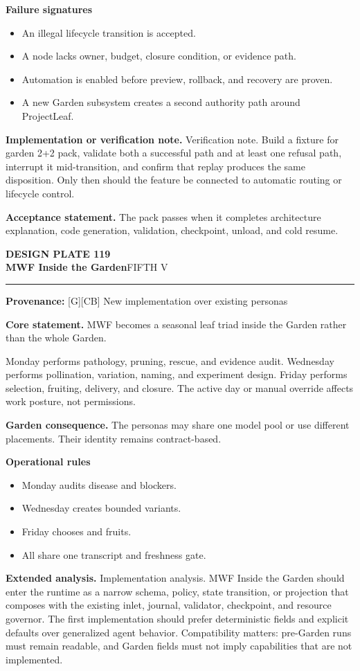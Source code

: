 \documentclass[10pt,letterpaper,oneside]{article}
\newcommand{\prov}[1]{\textcolor{gardenBlue}{\sffamily\footnotesize\textbf{Provenance:} #1}}
\newcommand{\platetitle}[3]{%
  \begin{minipage}[t][0.54in][t]{\textwidth}
  {\sffamily\bfseries\color{gardenDeep}\fontsize{9}{10}\selectfont DESIGN PLATE #1}\\[-1pt]
  {\sffamily\bfseries\color{gardenInk}\fontsize{16.5}{18}\selectfont #2}\hfill{\sffamily\color{gardenGreen}\large #3}
  \end{minipage}\vspace{-2pt}\hrule\vspace{5pt}}
\begin{document}
\textbf{Failure signatures}
\begin{itemize}
\item An illegal lifecycle transition is accepted.
\item A node lacks owner, budget, closure condition, or evidence path.
\item Automation is enabled before preview, rollback, and recovery are proven.
\item A new Garden subsystem creates a second authority path around ProjectLeaf.
\end{itemize}
\textbf{Implementation or verification note.} Verification note. Build a fixture for garden 2+2 pack, validate both a successful path and at least one refusal path, interrupt it mid-transition, and confirm that replay produces the same disposition. Only then should the feature be connected to automatic routing or lifecycle control.

\begin{acceptbox}
\textbf{Acceptance statement.} The pack passes when it completes architecture explanation, code generation, validation, checkpoint, unload, and cold resume.
\end{acceptbox}
\newpage
\platetitle{119}{MWF Inside the Garden}{FIFTH V}
\prov{[G][CB] New implementation over existing personas}
\fontsize{8.85}{10.45}\selectfont
\begin{corebox}
\textbf{Core statement.} MWF becomes a seasonal leaf triad inside the Garden rather than the whole Garden.
\end{corebox}
Monday performs pathology, pruning, rescue, and evidence audit. Wednesday performs pollination, variation, naming, and experiment design. Friday performs selection, fruiting, delivery, and closure. The active day or manual override affects work posture, not permissions.

\textbf{Garden consequence.} The personas may share one model pool or use different placements. Their identity remains contract-based.

\textbf{Operational rules}
\begin{itemize}
\item Monday audits disease and blockers.
\item Wednesday creates bounded variants.
\item Friday chooses and fruits.
\item All share one transcript and freshness gate.
\end{itemize}
\textbf{Extended analysis.} Implementation analysis. MWF Inside the Garden should enter the runtime as a narrow schema, policy, state transition, or projection that composes with the existing inlet, journal, validator, checkpoint, and resource governor. The first implementation should prefer deterministic fields and explicit defaults over generalized agent behavior. Compatibility matters: pre-Garden runs must remain readable, and Garden fields must not imply capabilities that are not implemented.
\end{document}
